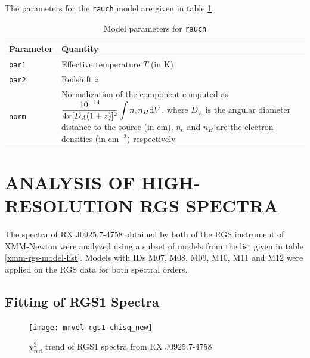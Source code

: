 				The parameters for the \texttt{rauch} model are given in table \ref{param:rauch}.
				\begin{table}[h!]
					\centering
					\caption{Model parameters for \texttt{rauch}}
					\label{param:rauch}
					\begin{tabular}{p{}p{}}
						\hline
						\textbf{Parameter} & \textbf{Quantity} \\ \hline
						{\texttt{par1}} & {Effective temperature $T$ (in K)} \\ %
						{\texttt{par2}} & {Redshift $z$} \\ %
						{\texttt{norm}} & {Normalization of the component computed as $\displaystyle\dfrac{10^{-14}}{4\pi[D_A(1+z)]^2}\int{n_en_H\mathrm{d}V}$, where $D_A$ is the angular diameter distance to the source (in cm), $n_e$ and $n_H$ are the electron densities (in cm$^{-3}$) respectively} \\ \hline
					\end{tabular}
				\end{table}
	
	\section{\MakeUppercase{Analysis of High-resolution RGS Spectra}} \label{hi-resolution:analysis}
		The spectra of RX J0925.7-4758 obtained by both of the RGS instrument of XMM-Newton were analyzed using a subset of models from the list given in table \ref{xmm-rgs-model-list}. Models with IDs M07, M08, M09, M10, M11 and M12 were applied on the RGS data for both spectral orders.
		
		\subsection{Fitting of RGS1 Spectra} \label{hi-resolution:analysis:rgs1}
		
			\begin{figure}[h!]
				\centering
				\texttt{[image: mrvel-rgs1-chisq\_new]}
				\caption{$\chi^2_\text{red}$ trend of RGS1 spectra from RX J0925.7-4758}
				\label{fig:mrvel-rgs1-chisq}
			\end{figure}
			
